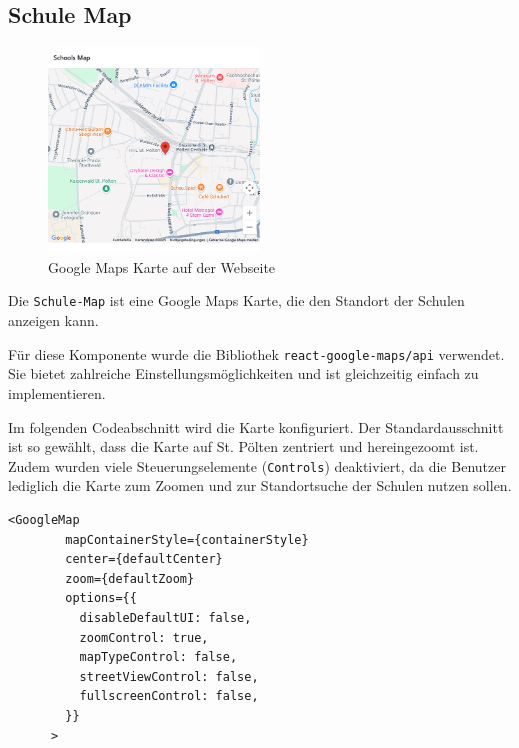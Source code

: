 \begin{inhalt}
\begin{enumerate}[label=\textbf{\arabic*.}]
\clearpage

\subsection{Schule Map}


\begin{figure}[!htb]
\centering
\includegraphics[width=0.5\textwidth]{files/Thomas/pics/Website/admin/school/school-map.png}
\caption[Google Maps Karte auf der Webseite]{Google Maps Karte auf der Webseite}
\label{fig:gehaeuse_internet_bild}
\end{figure}

Die \texttt{Schule-Map} ist eine Google Maps Karte, die den Standort der Schulen anzeigen kann.

\vspace{0.5cm}

Für diese Komponente wurde die Bibliothek \texttt{react-google-maps/api} verwendet.  
Sie bietet zahlreiche Einstellungsmöglichkeiten und ist gleichzeitig einfach zu implementieren.

\vspace{0.15cm}

Im folgenden Codeabschnitt wird die Karte konfiguriert.  
Der Standardausschnitt ist so gewählt, dass die Karte auf St. Pölten zentriert und hereingezoomt ist.  
Zudem wurden viele Steuerungselemente (\texttt{Controls}) deaktiviert, da die Benutzer lediglich die Karte zum Zoomen und zur Standortsuche der Schulen nutzen sollen.



\begin{lstlisting}[language=mytsx]
<GoogleMap
        mapContainerStyle={containerStyle}
        center={defaultCenter}
        zoom={defaultZoom}
        options={{
          disableDefaultUI: false,
          zoomControl: true,
          mapTypeControl: false,
          streetViewControl: false,
          fullscreenControl: false,
        }}
      >
\end{lstlisting}






\end{enumerate}
\end{inhalt}
